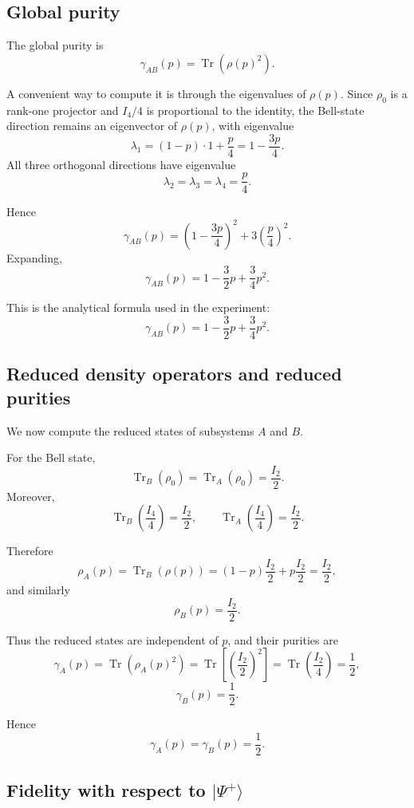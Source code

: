 \documentclass[a4paper]{article}
\begin{document}
\subsection*{Global purity}

The global purity is
\[
\gamma_{AB}(p) = \operatorname{Tr}(\rho(p)^2).
\]

A convenient way to compute it is through the eigenvalues of \(\rho(p)\). Since \(\rho_0\) is a rank-one projector and \(I_4/4\) is proportional to the identity, the Bell-state direction remains an eigenvector of \(\rho(p)\), with eigenvalue
\[
\lambda_1 = (1-p)\cdot 1 + \frac p4 = 1-\frac{3p}{4}.
\]
All three orthogonal directions have eigenvalue
\[
\lambda_2=\lambda_3=\lambda_4=\frac p4.
\]

Hence
\[
\gamma_{AB}(p)
=
\left(1-\frac{3p}{4}\right)^2 + 3\left(\frac p4\right)^2.
\]
Expanding,
\[
\gamma_{AB}(p)
=
1-\frac{3}{2}p+\frac{3}{4}p^2.
\]

This is the analytical formula used in the experiment:
\[
\gamma_{AB}(p)=1-\frac{3}{2}p+\frac{3}{4}p^2.
\]

\subsection*{Reduced density operators and reduced purities}

We now compute the reduced states of subsystems \(A\) and \(B\).

For the Bell state,
\[
\operatorname{Tr}_B(\rho_0)=\operatorname{Tr}_A(\rho_0)=\frac{I_2}{2}.
\]
Moreover,
\[
\operatorname{Tr}_B\!\left(\frac{I_4}{4}\right)=\frac{I_2}{2},
\qquad
\operatorname{Tr}_A\!\left(\frac{I_4}{4}\right)=\frac{I_2}{2}.
\]

Therefore
\[
\rho_A(p)=\operatorname{Tr}_B(\rho(p))
=
(1-p)\frac{I_2}{2}+p\frac{I_2}{2}
=
\frac{I_2}{2},
\]
and similarly
\[
\rho_B(p)=\frac{I_2}{2}.
\]

Thus the reduced states are independent of \(p\), and their purities are
\[
\gamma_A(p)=\operatorname{Tr}(\rho_A(p)^2)
=
\operatorname{Tr}\left[\left(\frac{I_2}{2}\right)^2\right]
=
\operatorname{Tr}\left(\frac{I_2}{4}\right)
=
\frac{1}{2},
\]
\[
\gamma_B(p)=\frac{1}{2}.
\]

Hence
\[
\gamma_A(p)=\gamma_B(p)=\frac12.
\]

\subsection*{Fidelity with respect to \texorpdfstring{$|\Psi^+\rangle$}{|Psi+>}}
\end{document}
